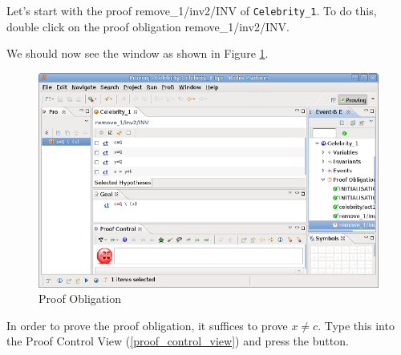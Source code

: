 
Let's start with the proof \textsf{remove\_1/inv2/INV} of \texttt{Celebrity\_1}. To do this, double click on the proof obligation \textsf{remove\_1/inv2/INV}.


We should now see the window as shown in Figure \ref{fig_tut_08_proof_obligation}.

\begin{figure}[!ht]
\begin{center}
	\includegraphics{img/tutorial/tut_08_proof2.png}
	\caption{Proof Obligation}
	\label{fig_tut_08_proof_obligation}
\end{center}
\end{figure}


In order to prove the proof obligation, it suffices to prove \textsf{$x \neq c$}. Type this into the \textsf{Proof Control View} (\ref{proof_control_view}) and press the \textsf{ button}. 

